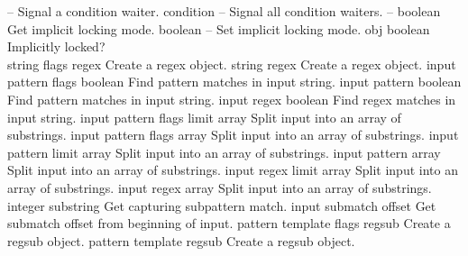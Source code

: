 \begin{longtable}{}
	{{\bf {}}}
	{--}
	{Signal a condition waiter.}
\hline
\optableent
	{condition}
	{{\bf {}}}
	{--}
	{Signal all condition waiters.}
\hline
\optableent
	{--}
	{{\bf {}}}
	{boolean}
	{Get implicit locking mode.}
\hline
\optableent
	{boolean}
	{{\bf {}}}
	{--}
	{Set implicit locking mode.}
\hline
\optableent
	{obj}
	{{\bf {}}}
	{boolean}
	{Implicitly locked?}
\hline \hline
{} \\
\hline \hline
\optableent
	{string flags}
	{{\bf {}}}
	{regex}
	{Create a regex object.}
\optableent
	{string}
	{{\bf {}}}
	{regex}
	{Create a regex object.}
\hline
\optableent
	{input pattern flags}
	{{\bf {}}}
	{boolean}
	{Find pattern matches in input string.}
\optableent
	{input pattern}
	{{\bf {}}}
	{boolean}
	{Find pattern matches in input string.}
\optableent
	{input regex}
	{{\bf {}}}
	{boolean}
	{Find regex matches in input string.}
\hline
\optableent
	{input pattern flags limit}
	{{\bf {}}}
	{array}
	{Split input into an array of substrings.}
\optableent
	{input pattern flags}
	{{\bf {}}}
	{array}
	{Split input into an array of substrings.}
\optableent
	{input pattern limit}
	{{\bf {}}}
	{array}
	{Split input into an array of substrings.}
\optableent
	{input pattern}
	{{\bf {}}}
	{array}
	{Split input into an array of substrings.}
\optableent
	{input regex limit}
	{{\bf {}}}
	{array}
	{Split input into an array of substrings.}
\optableent
	{input regex}
	{{\bf {}}}
	{array}
	{Split input into an array of substrings.}
\hline
\optableent
	{integer}
	{{\bf {}}}
	{substring}
	{Get capturing subpattern match.}
\hline
\optableent
	{input submatch}
	{{\bf {}}}
	{offset}
	{Get submatch offset from beginning of input.}
\hline
\optableent
	{pattern template flags}
	{{\bf {}}}
	{regsub}
	{Create a regsub object.}
\optableent
	{pattern template}
	{{\bf {}}}
	{regsub}
	{Create a regsub object.}
\hline
\optableent

\end{longtable}
